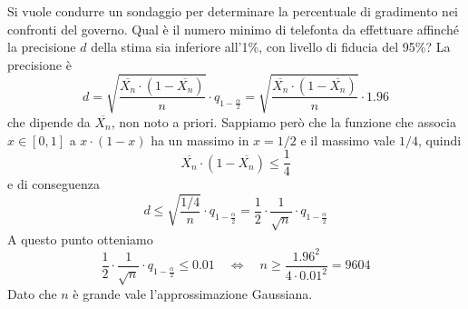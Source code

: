 \begin{example}
	Si vuole condurre un sondaggio per determinare la percentuale di gradimento nei confronti del
	governo. Qual è il numero minimo di telefonta da effettuare affinché la precisione $d$ della
	stima sia inferiore all'1\%, con livello di fiducia del 95\%? La precisione è
	\[
		d = \sqrt{\frac{\overline{X_n} \cdot (1 - \overline{X_n})}{n}} \cdot
		q_{1 - \frac{\alpha}{2}} = \sqrt{\frac{\overline{X_n} \cdot (1 - \overline{X_n})}{n}} \cdot
		1.96
	\]
	che dipende da $\overline{X_n}$, non noto a priori. Sappiamo però che la funzione che associa
	$x \in [0,1]$ a $x \cdot (1-x)$ ha un massimo in $x=1/2$ e il massimo vale $1/4$, quindi
	\[ \overline{X_n} \cdot (1 - \overline{X_n}) \leq \frac{1}{4} \]
	e di conseguenza
	\[
		d \leq \sqrt{\frac{1/4}{n}} \cdot q_{1 - \frac{\alpha}{2}} =
		\frac{1}{2} \cdot \frac{1}{\sqrt{n}} \cdot q_{1 - \frac{\alpha}{2}}
	\]
	A questo punto otteniamo
	\[
		\frac{1}{2} \cdot \frac{1}{\sqrt{n}} \cdot q_{1 - \frac{\alpha}{2}} \leq 0.01
		\quad \Leftrightarrow \quad
		n \geq \frac{1.96^2}{4 \cdot 0.01^2} = 9604
	\]
	Dato che $n$ è grande vale l'approssimazione Gaussiana.
\end{example}